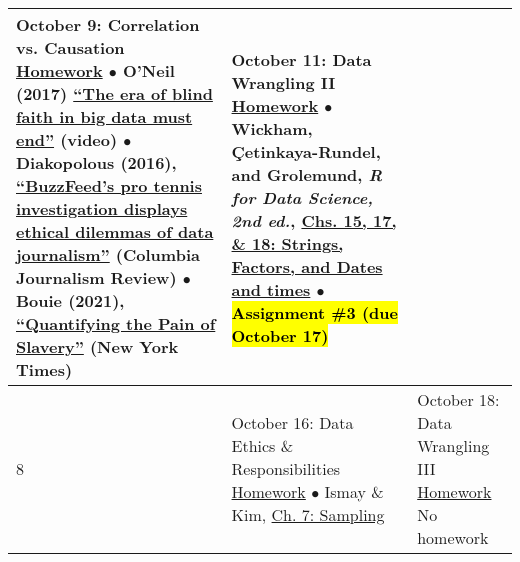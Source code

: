\documentclass[12pt,letterpaper]{article}
\begin{document}
\begin{tabularx}{\textwidth}{|p{}|p{}||p{}|}
October 9: Correlation vs. Causation \newline \newline
\ul{Homework} \newline
$\bullet$ O'Neil (2017)  \href{https://www.ted.com/talks/cathy_o_neil_the_era_of_blind_faith_in_big_data_must_end}{``The era of blind faith in big data must end''} (video) \newline
$\bullet$ Diakopolous (2016), \href{https://www.cjr.org/tow_center/transparency_algorithms_buzzfeed.php}{``BuzzFeed's pro tennis investigation displays ethical dilemmas of data journalism''} (Columbia Journalism Review) \newline
$\bullet$ Bouie (2021), \href{https://www.nytimes.com/2022/01/28/opinion/slavery-voyages-data-sets.html?unlocked_article_code=AAAAAAAAAAAAAAAACEIPuomT1JKd6J17Vw1cRCfTTMQmqxCdw_PIxftm3iWka3DMDmwSiOMNAo6B_EGKfq5qedYpznGFQ85IP7I0AfB70uYaJEFxUE-ovp6A0twjEhkClLiSDCkwzo6fGvcx6yPrZW20b7wunbDk5hmPdWXsUfbA1SZwLBI2pJRlaVz62nUClvzHErUm08Jsnqt0XuAMTjkKYCWOt_foGk8-bI3ANkeAn1FwD-JJWjjTnsqe66YBcWhRD1HGRHB95gUs-Y8WeYNXbOukcUlWKIepiq4RC2doMI6oG5QyIoDRnL5hurfJwgeeak8qYELPltMIK9ta2EiT_g\&smid=url-share}{``Quantifying the Pain of Slavery''} (New York Times) &

October 11: Data Wrangling II \newline \newline
\ul{Homework} \newline
$\bullet$ Wickham, Çetinkaya-Rundel, and Grolemund, \emph{R for Data Science, 2nd ed.}, \href{https://r4ds.hadley.nz/}{Chs. 15, 17, \& 18: Strings, Factors, and Dates and times} \newline
$\bullet$ \hl{Assignment \#3 (due October 17)} \\


\hline
\multirow{6}{*}{8} &

October 16: Data Ethics \& Responsibilities \newline \newline
\ul{Homework} \newline
$\bullet$ Ismay \& Kim, \href{https://moderndive.com/7-sampling.html}{Ch. 7: Sampling} &

October 18: Data Wrangling III \newline \newline
\ul{Homework} \newline
No homework


\hline
\multirow{6}{*}{9} &


\end{tabularx}
\end{document}
